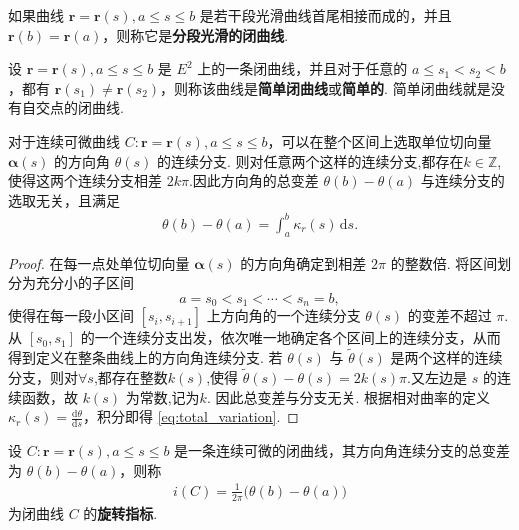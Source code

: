 \documentclass[../../main.tex]{subfiles}%
\begin{document}
\begin{definition}[分段光滑闭曲线]
如果曲线 $\bm{r}=\bm{r}(s), a\leqslant s\leqslant b$ 是若干段光滑曲线首尾相接而成的，并且 $\bm{r}(b)=\bm{r}(a)$，则称它是\textbf{分段光滑的闭曲线}.
\end{definition}

\begin{definition}[简单闭曲线]
设 $\bm{r}=\bm{r}(s), a\leqslant s\leqslant b$ 是 $E^2$ 上的一条闭曲线，并且对于任意的 $a\leqslant s_1<s_2<b$，都有 $\bm{r}(s_1)\neq\bm{r}(s_2)$，则称该曲线是\textbf{简单闭曲线}或\textbf{简单的}. 简单闭曲线就是没有自交点的闭曲线.
\end{definition}

\begin{theorem}
对于连续可微曲线 $C:\bm{r}=\bm{r}(s),a\leqslant s\leqslant b$，可以在整个区间上选取单位切向量 $\bm{\alpha}(s)$ 的方向角 $\theta(s)$ 的连续分支. 则对任意两个这样的连续分支,都存在$k\in \mathbb{Z}$,使得这两个连续分支相差 $2k\pi$.因此方向角的总变差 $\theta(b)-\theta(a)$ 与连续分支的选取无关，且满足
\begin{align}
\theta(b)-\theta(a)=\int_a^b \kappa_r(s)\,\mathrm{d}s. \label{eq:total_variation}
\end{align}
\end{theorem}
\begin{proof}
在每一点处单位切向量 $\bm{\alpha}(s)$ 的方向角确定到相差 $2\pi$ 的整数倍. 将区间划分为充分小的子区间
\[
a=s_0<s_1<\cdots<s_n=b,
\]
使得在每一段小区间 $[s_i,s_{i+1}]$ 上方向角的一个连续分支 $\theta(s)$ 的变差不超过 $\pi$. 从 $[s_0,s_1]$ 的一个连续分支出发，依次唯一地确定各个区间上的连续分支，从而得到定义在整条曲线上的方向角连续分支. 若 $\theta(s)$ 与 $\tilde{\theta}(s)$ 是两个这样的连续分支，则对$\forall s$,都存在整数$k(s)$,使得 $\tilde{\theta}(s)-\theta(s)=2k(s)\pi$.又左边是 $s$ 的连续函数，故 $k(s)$ 为常数,记为$k$. 因此总变差与分支无关. 根据相对曲率的定义 $\kappa_r(s)=\frac{\mathrm{d}\theta}{\mathrm{d}s}$，积分即得 \eqref{eq:total_variation}.
\end{proof}

\begin{definition}[旋转指标]
设 $C:\bm{r}=\bm{r}(s),a\leqslant s\leqslant b$ 是一条连续可微的闭曲线，其方向角连续分支的总变差为 $\theta(b)-\theta(a)$，则称
\begin{align}
i(C)=\frac{1}{2\pi}\bigl(\theta(b)-\theta(a)\bigr) \label{eq:rotation_index}
\end{align}
为闭曲线 $C$ 的\textbf{旋转指标}.
\end{definition}
\end{document}
